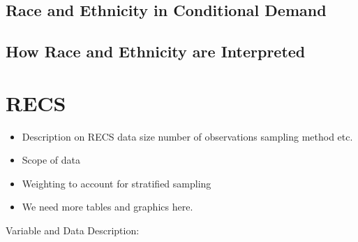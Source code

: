 \documentclass{article}
\begin{document}
% 





  \subsection{Race and Ethnicity in Conditional Demand}
  
  \subsection{How Race and Ethnicity are Interpreted}

\section{RECS}


\begin{itemize}
  \item Description on RECS data size number of observations sampling method etc.
  \item Scope of data  
  \item Weighting to account for stratified sampling
  \item We need more tables and graphics here.
\end{itemize}

Variable and Data Description: 
\end{document}
